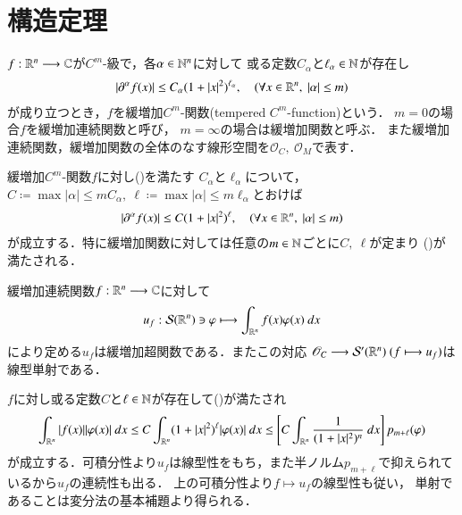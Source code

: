 \section{構造定理}
	\begin{screen}
		\begin{dfn}[緩増加$C^m$-関数]
			$f:\mathbb{R}^n \longrightarrow \mathbb{C}$が$C^m$-級で，各$\alpha \in \mathbb{N}^n$に対して
			或る定数$C_\alpha$と$\ell_\alpha \in \mathbb{N}$が存在し
			\begin{align}
				\left| \partial^\alpha f(x) \right| \leq C_\alpha(1+|x|^2)^{\ell_\alpha},
				\quad (\forall x \in \mathbb{R}^n,\ |\alpha| \leq m)
				\label{eq:tempered_c^m_function}
			\end{align}
			が成り立つとき，$f$を緩増加$C^m$-関数(tempered $C^m$-function)という．
			$m=0$の場合$f$を緩増加連続関数と呼び，
			$m=\infty$の場合は緩増加関数と呼ぶ．
			また緩増加連続関数，緩増加関数の全体のなす線形空間を$\mathscr{O}_C,\ \mathscr{O}_M$で表す．
		\end{dfn}
	\end{screen}
	
	緩増加$C^m$-関数$f$に対し()を満たす
	$C_\alpha$と$\ell_\alpha$について，
	$C \coloneqq \max{|\alpha| \leq m}{C_\alpha}
	,\ \ell \coloneqq \max{|\alpha| \leq m}{\ell_\alpha}$とおけば
	\begin{align}
		\left| \partial^\alpha f(x) \right| \leq C(1+|x|^2)^\ell,
		\quad (\forall x \in \mathbb{R}^n,\ |\alpha| \leq m)
		\label{eq:tempered_c^m_function_2}
	\end{align}
	が成立する．特に緩増加関数に対しては任意の$m \in \mathbb{N}$ごとに$C,\ \ell$が定まり
	()が満たされる．
	
	\begin{screen}
		\begin{thm}[緩増加連続関数により定まる緩増加超関数]
		\label{thm:tempered_continuous_functions_and_tempered_distributions}
			緩増加連続関数$f:\mathbb{R}^n \longrightarrow \mathbb{C}$に対して
			\begin{align}
				u_f: \mathcal{S}(\mathbb{R}^n) \ni \varphi \longmapsto
				\int_{\mathbb{R}^n} f(x) \varphi(x)\ dx
			\end{align}
			により定める$u_f$は緩増加超関数である．またこの対応
			$\mathscr{O}_C \longrightarrow \mathcal{S}'(\mathbb{R}^n)\ (f \longmapsto u_f)$は
			線型単射である．
		\end{thm}
	\end{screen}
	
	\begin{prf}
		$f$に対し或る定数$C$と$\ell \in \mathbb{N}$が存在して()が満たされ
		\begin{align}
			\int_{\mathbb{R}^n} |f(x)| |\varphi(x)|\ dx
			\leq C \int_{\mathbb{R}^n} (1+|x|^2)^\ell |\varphi(x)|\ dx
			\leq \left[ C \int_{\mathbb{R}^n} \frac{1}{(1+|x|^2)^n}\ dx \right] p_{m+\ell}(\varphi) 
		\end{align}
		が成立する．可積分性より$u_f$は線型性をもち，また半ノルム$p_{m+\ell}$で抑えられているから$u_f$の連続性も出る．
		上の可積分性より$f \longmapsto u_f$の線型性も従い，
		単射であることは変分法の基本補題より得られる．
		\QED
	\end{prf}